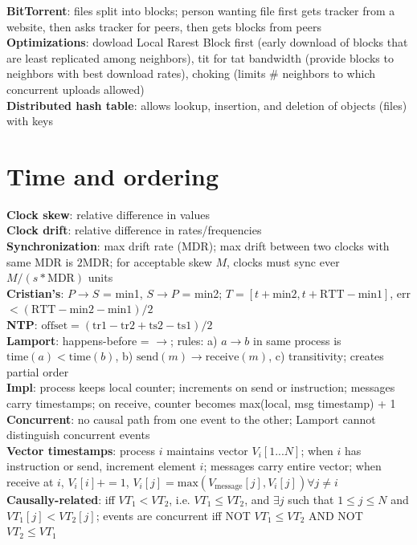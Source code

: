 \documentclass{article}
\begin{document}
\begin{multicols*}{3}
\textbf{BitTorrent}: files split into blocks; person wanting file first gets tracker from a website, then asks tracker for peers, then gets blocks from peers \\
\textbf{Optimizations}: dowload Local Rarest Block first (early download of blocks that are least replicated among neighbors), tit for tat bandwidth (provide blocks to neighbors with best download rates), choking (limits \# neighbors to which concurrent uploads allowed) \\
\textbf{Distributed hash table}: allows lookup, insertion, and deletion of objects (files) with keys

\section{Time and ordering}
\textbf{Clock skew}: relative difference in values \\
\textbf{Clock drift}: relative difference in rates/frequencies \\
\textbf{Synchronization}: max drift rate (MDR); max drift between two clocks with same MDR is $2\text{MDR}$; for acceptable skew $M$, clocks must sync ever $M/(s*\text{MDR})$ units \\
\textbf{Cristian's}: $P\rightarrow S$ = min1, $S\rightarrow P$ = min2; $T = [t + \text{min2}, t + \text{RTT} - \text{min1}]$, err $< (\text{RTT}-\text{min2}-\text{min1})/2$ \\
\textbf{NTP}: $\text{offset} = (\text{tr1} - \text{tr2} + \text{ts2} - \text{ts1})/2$ \\
\textbf{Lamport}: happens-before = $\rightarrow$; rules: a) $a \rightarrow b$ in same process is $\text{time}(a) < \text{time}(b)$, b) $\text{send}(m) \rightarrow \text{receive}(m)$, c) transitivity; creates partial order \\
\textbf{Impl}: process keeps local counter; increments on send or instruction; messages carry timestamps; on receive, counter becomes max(local, msg timestamp) + 1 \\
\textbf{Concurrent}: no causal path from one event to the other; Lamport cannot distinguish concurrent events \\
\textbf{Vector timestamps}: process $i$ maintains vector $V_i[1...N]$; when $i$ has instruction or send, increment element $i$; messages carry entire vector; when receive at $i$, $V_i[i] += 1$, $V_i[j] = \text{max}(V_\text{message}[j], V_i[j]) \forall j \neq i$ \\
\textbf{Causally-related}: iff $VT_1 < VT_2$, i.e. $VT_1 \leq VT_2$, and $\exists j$ such that $1 \leq j \leq N$ and $VT_1[j] < VT_2[j]$; events are concurrent iff NOT $VT_1 \leq VT_2$ AND NOT $VT_2 \leq VT_1$ \\


\end{multicols*}
\end{document}
